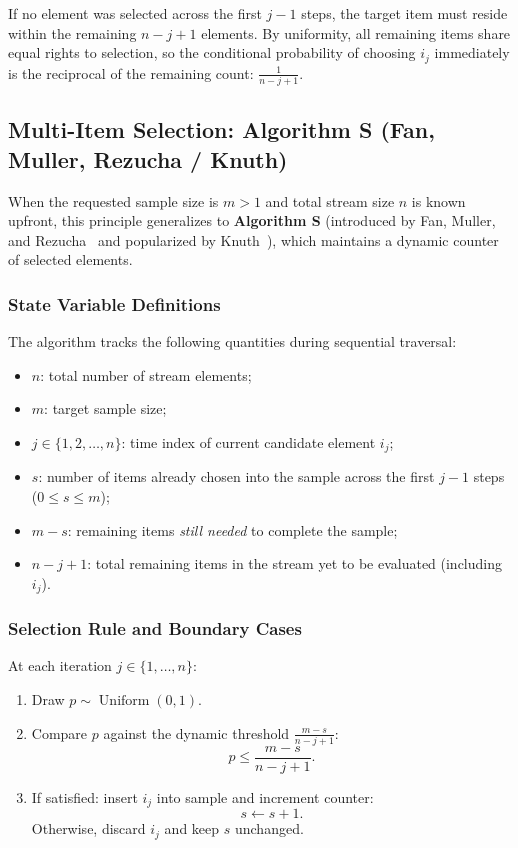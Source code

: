 If no element was selected across the first $j - 1$ steps, the target item must reside within the remaining $n - j + 1$ elements. By uniformity, all remaining items share equal rights to selection, so the conditional probability of choosing $i_j$ immediately is the reciprocal of the remaining count: $\frac{1}{n - j + 1}$.

\FloatBarrier
\subsection{Multi-Item Selection: Algorithm S (Fan, Muller, Rezucha / Knuth)}
When the requested sample size is $m > 1$ and total stream size $n$ is known upfront, this principle generalizes to \textbf{Algorithm S} (introduced by Fan, Muller, and Rezucha~\cite{fan1962} and popularized by Knuth~\cite{knuth1997}), which maintains a dynamic counter of selected elements.

\subsubsection{State Variable Definitions}
The algorithm tracks the following quantities during sequential traversal:
\begin{itemize}
  \item $n$: total number of stream elements;
  \item $m$: target sample size;
  \item $j \in \{1, 2, \dots, n\}$: time index of current candidate element $i_j$;
  \item $s$: number of items already chosen into the sample across the first $j - 1$ steps ($0 \le s \le m$);
  \item $m - s$: remaining items \emph{still needed} to complete the sample;
  \item $n - j + 1$: total remaining items in the stream yet to be evaluated (including $i_j$).
\end{itemize}

\subsubsection{Selection Rule and Boundary Cases}
At each iteration $j \in \{1, \dots, n\}$:
\begin{enumerate}
  \item Draw $p \sim \operatorname{Uniform}(0, 1)$.
  \item Compare $p$ against the dynamic threshold $\frac{m - s}{n - j + 1}$:
  \begin{equation}
    p \le \frac{m - s}{n - j + 1}.
    \label{eq:algorithm-s-threshold}
  \end{equation}
  \item If satisfied: insert $i_j$ into sample and increment counter:
  \begin{equation}
    s \leftarrow s + 1.
  \end{equation}
  Otherwise, discard $i_j$ and keep $s$ unchanged.
\end{enumerate}

